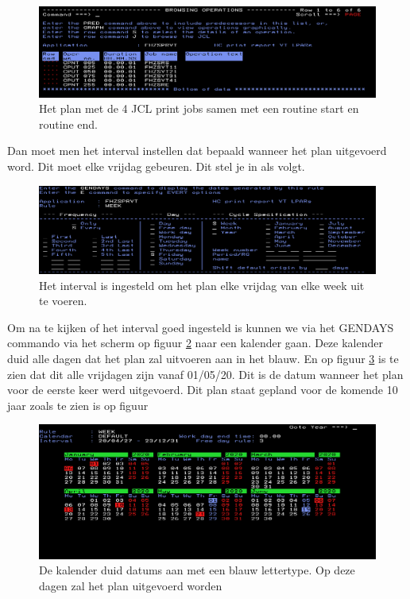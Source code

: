 \begin{figure}[h]
	\centering
	\includegraphics[width=1\linewidth]{img/IWS}
	\caption[Plan voor de print jobs]{Het plan met de 4 JCL print jobs samen met een routine start en routine end.}
	\label{fig:iws}
\end{figure}

Dan moet men het interval instellen dat bepaald wanneer het plan uitgevoerd word. Dit moet elke vrijdag gebeuren. Dit stel je in als volgt.

\begin{figure}[h]
	\centering
	\includegraphics[width=1\linewidth]{img/Interval}
	\caption[Interval in IWS]{Het interval is ingesteld om het plan elke vrijdag van elke week uit te voeren.}
	\label{fig:interval}
\end{figure}

Om na te kijken of het interval goed ingesteld is kunnen we via het GENDAYS commando via het scherm op figuur \ref{fig:interval} naar een kalender gaan. Deze kalender duid alle dagen dat het plan zal uitvoeren aan in het blauw. En op figuur \ref{fig:calender} is te zien dat dit alle vrijdagen zijn vanaf 01/05/20. Dit is de datum wanneer het plan voor de eerste keer werd uitgevoerd. Dit plan staat gepland voor de komende 10 jaar zoals te zien is op figuur 

\begin{figure}[h]
	\centering
	\includegraphics[width=1\linewidth]{img/Calender}
	\caption[Kalender IWS]{De kalender duid datums aan met een blauw lettertype. Op deze dagen zal het plan uitgevoerd worden}
	\label{fig:calender}
\end{figure}

